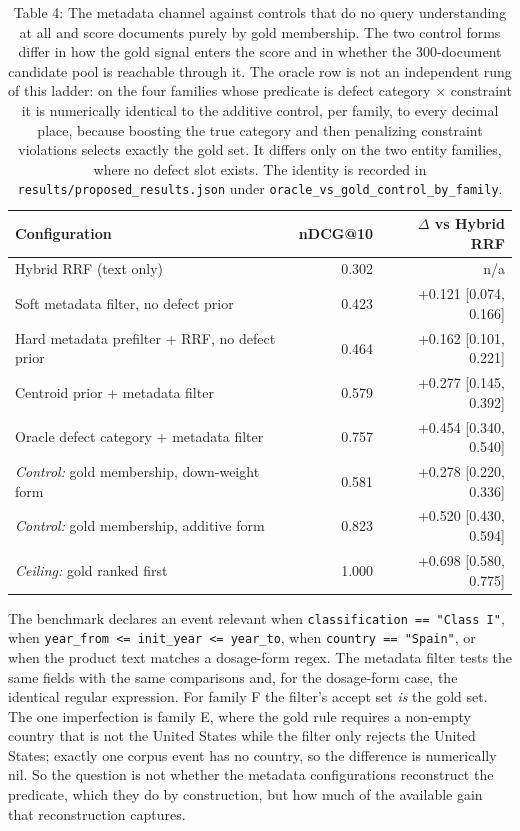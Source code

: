 \documentclass[acmsmall]{acmart}
\begin{document}
\begin{table}[t]
\centering
\small
\caption{Table 4: The metadata channel against controls that do no query understanding at all and score documents purely by gold membership. The two control forms differ in how the gold signal enters the score and in whether the 300-document candidate pool is reachable through it. The oracle row is not an independent rung of this ladder: on the four families whose predicate is defect category $\times$ constraint it is numerically identical to the additive control, per family, to every decimal place, because boosting the true category and then penalizing constraint violations selects exactly the gold set. It differs only on the two entity families, where no defect slot exists. The identity is recorded in \texttt{results/proposed\_\allowbreak{}results.json} under \texttt{oracle\_vs\_\allowbreak{}gold\_\allowbreak{}control\_\allowbreak{}by\_family}.}
\begin{tabular}{lrr}
\toprule
Configuration & \textbf{nDCG@10} & $\Delta$ vs Hybrid RRF \\
\midrule
Hybrid RRF (text only) & 0.302 & n/a \\
Soft metadata filter, no defect prior & 0.423 & +0.121 [0.074, 0.166] \\
Hard metadata prefilter + RRF, no defect prior & 0.464 & +0.162 [0.101, 0.221] \\
Centroid prior + metadata filter & 0.579 & +0.277 [0.145, 0.392] \\
Oracle defect category + metadata filter & 0.757 & +0.454 [0.340, 0.540] \\
\textit{Control:} gold membership, down-weight form & 0.581 & +0.278 [0.220, 0.336] \\
\textit{Control:} gold membership, additive form & 0.823 & +0.520 [0.430, 0.594] \\
\textit{Ceiling:} gold ranked first & 1.000 & +0.698 [0.580, 0.775] \\
\bottomrule
\end{tabular}
\end{table}

The benchmark declares an event relevant when \texttt{classification == "Class I"}, when \texttt{year\_from <= init\_\allowbreak{}year <= year\_to}, when \texttt{country == "Spain"}, or when the product text matches a dosage-form regex. The metadata filter tests the same fields with the same comparisons and, for the dosage-form case, the identical regular expression. For family F the filter's accept set \textit{is} the gold set. The one imperfection is family E, where the gold rule requires a non-empty country that is not the United States while the filter only rejects the United States; exactly one corpus event has no country, so the difference is numerically nil. So the question is not whether the metadata configurations reconstruct the predicate, which they do by construction, but how much of the available gain that reconstruction captures.
\end{document}
